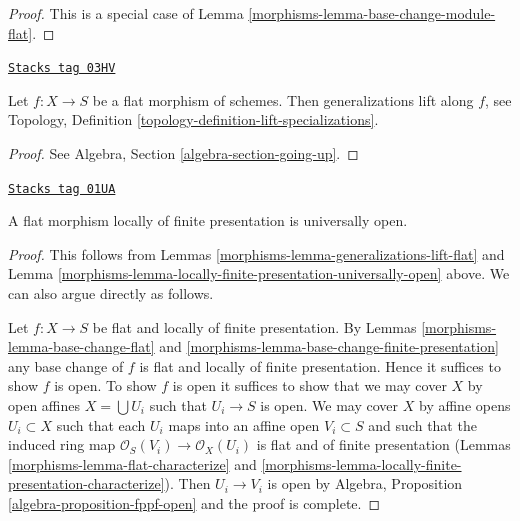 \begin{proof}

This is a special case of Lemma \ref{morphisms-lemma-base-change-module-flat}.
\end{proof}

\begin{lemma}
\label{morphisms-lemma-generalizations-lift-flat}
\href{https://stacks.math.columbia.edu/tag/03HV}{\texttt{Stacks tag 03HV}}

Let $f : X \to S$ be a flat morphism of schemes.
Then generalizations lift along $f$, see
Topology, Definition \ref{topology-definition-lift-specializations}.
\end{lemma}

\begin{proof}
See Algebra, Section \ref{algebra-section-going-up}.
\end{proof}

\begin{lemma}
\label{morphisms-lemma-fppf-open}
\href{https://stacks.math.columbia.edu/tag/01UA}{\texttt{Stacks tag 01UA}}

A flat morphism locally of finite presentation is universally open.
\end{lemma}

\begin{proof}

This follows from Lemmas \ref{morphisms-lemma-generalizations-lift-flat} and
Lemma \ref{morphisms-lemma-locally-finite-presentation-universally-open} above.
We can also argue directly as follows.

\medskip\noindent
Let $f : X \to S$ be flat and locally of finite presentation.
By Lemmas \ref{morphisms-lemma-base-change-flat} and
\ref{morphisms-lemma-base-change-finite-presentation} any base change of $f$ is flat
and locally of finite presentation. Hence it suffices to show $f$ is open.
To show $f$ is open it suffices to show that we may cover
$X$ by open affines $X = \bigcup U_i$ such that $U_i \to S$
is open. We may cover $X$ by affine opens $U_i \subset X$ such that each
$U_i$ maps into an affine open $V_i \subset S$ and such that
the induced ring map $\mathcal{O}_S(V_i) \to \mathcal{O}_X(U_i)$ is
flat and of finite presentation (Lemmas \ref{morphisms-lemma-flat-characterize} and
\ref{morphisms-lemma-locally-finite-presentation-characterize}).
Then $U_i \to V_i$ is open by
Algebra, Proposition \ref{algebra-proposition-fppf-open}
and the proof is complete.
\end{proof}


